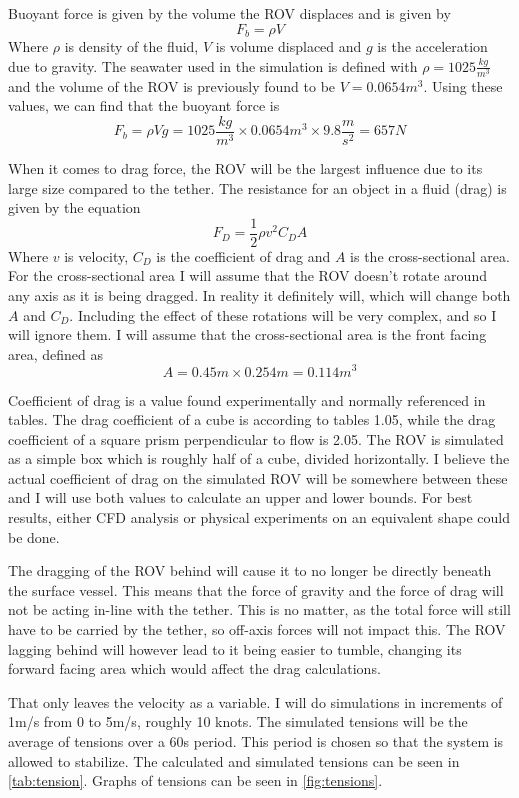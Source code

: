 Buoyant force is given by the volume the ROV displaces and is given by 
\[F_b = \rho V\]
Where \(\rho\) is density of the fluid, \(V\) is volume displaced and \(g\) is the acceleration due to gravity. The seawater used in the simulation is defined with \(\rho = 1025\frac{kg}{m^3}\) and the volume of the ROV is previously found to be \(V=0.0654m^3\). Using these values, we can find that the buoyant force is 
\[F_b = \rho V g = 1025\frac{kg}{m^3} \times 0.0654m^3 \times 9.8\frac{m}{s^2} = 657N\]

When it comes to drag force, the ROV will be the largest influence due to its large size compared to the tether. The resistance for an object in a fluid (drag) is given by the equation 
\[F_D = \frac 1 2 \rho v^2 C_D A\]
Where \(v\) is velocity, \(C_D\) is the coefficient of drag and \(A\) is the cross-sectional area. For the cross-sectional area I will assume that the ROV doesn't rotate around any axis as it is being dragged. In reality it definitely will, which will change both \(A\) and \(C_D\). Including the effect of these rotations will be very complex, and so I will ignore them. I will assume that the cross-sectional area is the front facing area, defined as \[A = 0.45m\times 0.254m = 0.114m^3\]

Coefficient of drag is a value found experimentally and normally referenced in tables. The drag coefficient of a cube is according to tables 1.05, while the drag coefficient of a square prism perpendicular to flow is 2.05. The ROV is simulated as a simple box which is roughly half of a cube, divided horizontally. I believe the actual coefficient of drag on the simulated ROV will be somewhere between these and I will use both values to calculate an upper and lower bounds. For best results, either CFD analysis  or physical experiments on an equivalent shape could be done.

The dragging of the ROV behind will cause it to no longer be directly beneath the surface vessel. This means that the force of gravity and the force of drag will not be acting in-line with the tether. This is no matter, as the total force will still have to be carried by the tether, so off-axis forces will not impact this. The ROV lagging behind will however lead to it being easier to tumble, changing its forward facing area which would affect the drag calculations. 

That only leaves the velocity as a variable. I will do simulations in increments of 1m/s from 0 to 5m/s, roughly 10 knots. The simulated tensions will be the average of tensions over a 60s period. This period is chosen so that the system is allowed to stabilize. The calculated and simulated tensions can be seen in \cref{tab:tension}. Graphs of tensions can be seen in \cref{fig:tensions}. 

